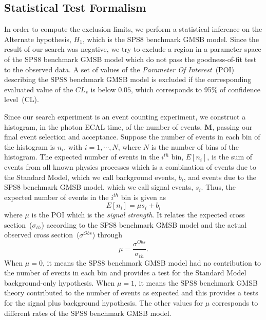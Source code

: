\subsection{Statistical Test Formalism}
In order to compute the exclusion limits, we perform a statistical inference on the Alternate hypothesis, $H_{1}$, which is the SPS8 benchmark GMSB model. Since the result of our search was negative, we try to exclude a region in a parameter space of the SPS8  benchmark GMSB model which do not pass the goodness-of-fit test to the observed data. A set of values of the \textit{Parameter Of Interest}~(POI) describing the SPS8 benchmark GMSB model is excluded if the corresponding evaluated value of the $CL_{s}$ is below $0.05$, which corresponds to 95\% of confidence level~(CL).
\par 
Since our search experiment is an event counting experiment, we construct a histogram, in the photon ECAL time, of the number of events, $\mathbf{M}$, passing our final event selection and acceptance. Suppose the number of events in each bin of the histogram is $n_{i}$,  with $i = 1, \cdots, N$, where $N$ is the number of bins of the histogram. The expected number of events in the $i^{th}$ bin, $E[n_{i}]$, is the sum of events from all known physics processes which is a combination of events due to the Standard Model, which we  call background events, $b_{i}$, and events due to the  SPS8 benchmark GMSB model, which we call signal events, $s_{i}$. Thus, the expected number of events in the $i^{th}$ bin is given as
\begin{equation}
 E[n_{i}] = \mu s_{i} + b_{i}
\end{equation}
where $\mu$ is the  POI which is the \textit{signal strength}. It relates the expected cross section~($\sigma_{th}$) according to the SPS8  benchmark GMSB model and the actual observed cross section~($\sigma^{Obs}$) through 
\begin{equation}
\mu = \frac{\sigma^{Obs}}{\sigma_{th}}.
\end{equation}
When $\mu = 0$, it means the  SPS8  benchmark GMSB model had no contribution to the number of events in each bin and provides a test for the Standard Model background-only hypothesis. When $\mu=1$, it means the SPS8  benchmark GMSB theory contributed to the number of events as expected and this provides a tests for the signal plus background hypothesis. The other values for $\mu$ corresponds to different rates of the SPS8 benchmark GMSB model.
\par 
